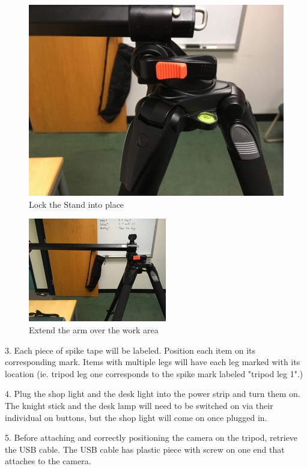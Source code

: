 \begin{figure}[!htp]
\centering
\includegraphics[scale=1.4]{Lock_2}
\caption{Lock the Stand into place}
\label{Figure 2}
\end{figure}

\begin{figure}[!htp]
\centering
\includegraphics[scale=2.5]{Lock_3}
\caption{Extend the arm over the work area}
\label{Figure 3}
\end{figure}

\newpage

3. Each piece of spike tape will be labeled. Position each item on its corresponding mark. Items with multiple legs will have each leg marked with its location (ie. tripod leg one corresponds to the spike mark labeled "tripod leg 1".) 

4. Plug the shop light and the desk light into the power strip and turn them on. The knight stick and the desk lamp will need to be switched on via their individual on buttons, but the shop light will come on once plugged in. 

5. Before attaching and correctly positioning the camera on the tripod, retrieve the USB cable. The USB cable has plastic piece with screw on one end that attaches to the camera.

